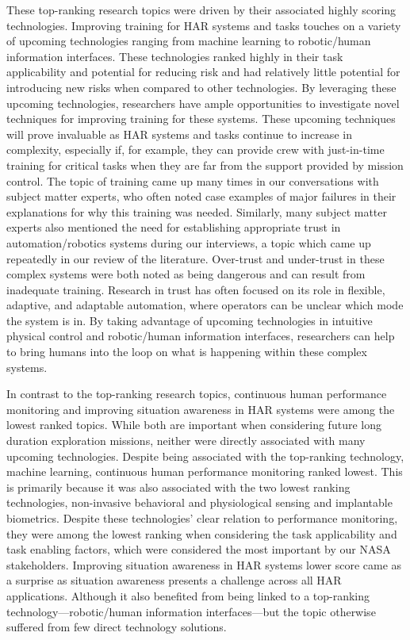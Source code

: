 These top-ranking research topics were driven by their associated highly scoring technologies. Improving training for HAR systems and tasks touches on a variety of upcoming technologies ranging from machine learning to robotic/human information interfaces. These technologies ranked highly in their task applicability and potential for reducing risk and had relatively little potential for introducing new risks when compared to other technologies. By leveraging these upcoming technologies, researchers have ample opportunities to investigate novel techniques for improving training for these systems. These upcoming techniques will prove invaluable as HAR systems and tasks continue to increase in complexity, especially if, for example, they can provide crew with just-in-time training for critical tasks when they are far from the support provided by mission control. The topic of training came up many times in our conversations with subject matter experts, who often noted case examples of major failures in their explanations for why this training was needed. Similarly, many subject matter experts also mentioned the need for establishing appropriate trust in automation/robotics systems during our interviews, a topic which came up repeatedly in our review of the literature. Over-trust and under-trust in these complex systems were both noted as being dangerous and can result from inadequate training. Research in trust has often focused on its role in flexible, adaptive, and adaptable automation, where operators can be unclear which mode the system is in. By taking advantage of upcoming technologies in intuitive physical control and robotic/human information interfaces, researchers can help to bring humans into the loop on what is happening within these complex systems.

In contrast to the top-ranking research topics, continuous human performance monitoring and improving situation awareness in HAR systems were among the lowest ranked topics. While both are important when considering future long duration exploration missions, neither were directly associated with many upcoming technologies. Despite being associated with the top-ranking technology, machine learning, continuous human performance monitoring ranked lowest. This is primarily because it was also associated with the two lowest ranking technologies, non-invasive behavioral and physiological sensing and implantable biometrics. Despite these technologies’ clear relation to performance monitoring, they were among the lowest ranking when considering the task applicability and task enabling factors, which were considered the most important by our NASA stakeholders. Improving situation awareness in HAR systems lower score came as a surprise as situation awareness presents a challenge across all HAR applications. Although it also benefited from being linked to a top-ranking technology—robotic/human information interfaces—but the topic otherwise suffered from few direct technology solutions.

